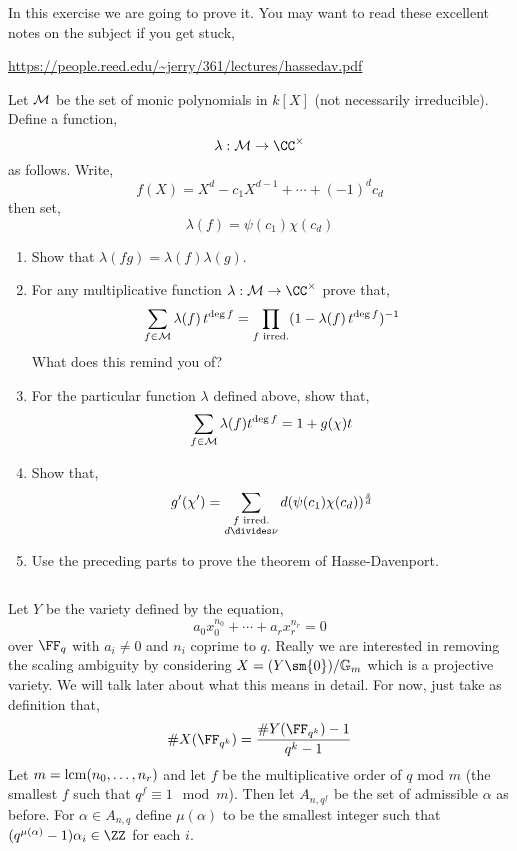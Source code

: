 \documentclass[12pt]{article}
\begin{document}
In this exercise we are going to prove it. You may want to read these excellent notes on the subject if you get stuck,

\begin{center}
\url{https://people.reed.edu/~jerry/361/lectures/hassedav.pdf}
\end{center}

Let $\mathcal{M}$ be the set of monic polynomials in $k[X]$ (not necessarily irreducible). Define a function,
\[ \lambda : \M \to \CC^\times \]
as follows. Write,
\[ f(X) = X^d - c_1 X^{d-1} + \cdots + (-1)^d c_d \]
then set,
\[ \lambda(f) = \psi(c_1) \chi(c_d) \]

\begin{enumerate}
\item Show that $\lambda(fg) = \lambda(f) \lambda(g)$.

\item For any multiplicative function $\lambda : \M \to \CC^\times$ prove that,
\[ \sum_{f \in \mathcal{M}} \lambda(f) \, t^{\deg{f}} = \prod_{f \text{ irred.}} (1 - \lambda(f) \, t^{\deg{f}})^{-1} \]
What does this remind you of?

\item For the particular function $\lambda$ defined above, show that,
\[ \sum_{f \in \mathcal{M}} \lambda(f) t^{\deg{f}} = 1 + g(\chi) t \]

\item Show that,
\[ g'(\chi') = \sum_{\substack{f \text{ irred.} \\ d \divides \nu}} d (\psi(c_1) \chi(c_d))^{\frac{s}{d}} \]

\item Use the preceding parts to prove the theorem of Hasse-Davenport.
\end{enumerate}

\subsection{} \label{proof_of_thm}

Let $Y$ be the variety defined by the equation,
\[ a_0 x_0^{n_0} + \cdots + a_r x_r^{n_r} = 0 \]
over $\FF_q$ with $a_i \neq 0$ and $n_i$ coprime to $q$. Really we are interested in removing the scaling ambiguity by considering $X = (Y \sm \{ 0 \})/\Gm$ which is a projective variety. We will talk later about what this means in detail. For now, just take as definition that,
\[ \# X(\FF_{q^k}) = \frac{\# Y(\FF_{q^k}) - 1}{q^k - 1} \]
Let $m = \mathrm{lcm}{(n_0, \dots, n_r)}$ and let $f$ be the multiplicative order of $q$ mod $m$ (the smallest $f$ such that $q^f \equiv 1 \mod m$). Then let $A_{n,q^f}$ be the set of admissible $\alpha$ as before. For $\alpha \in A_{n,q}$ define $\mu(\alpha)$ to be the smallest integer such that $(q^{\mu(\alpha)}-1) \alpha_i \in \ZZ$ for each $i$.
\end{document}
